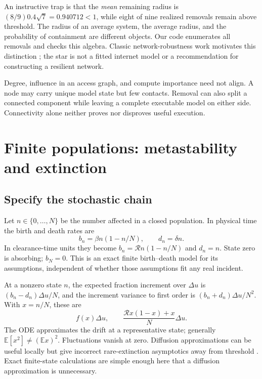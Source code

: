 \documentclass[11pt]{article}
\newcommand{\E}{\mathbb E}
\newcommand{\R}{\mathcal R}
\begin{document}
An instructive trap is that the \emph{mean} remaining radius is $(8/9)0.4\sqrt7=0.940712<1$, while eight of nine realized removals remain above threshold. The radius of an average system, the average radius, and the probability of containment are different objects. Our code enumerates all removals and checks this algebra. Classic network-robustness work motivates this distinction \citep{albert}; the star is not a fitted internet model or a recommendation for constructing a resilient network.

Degree, influence in an access graph, and compute importance need not align. A node may carry unique model state but few contacts. Removal can also split a connected component while leaving a complete executable model on either side. Connectivity alone neither proves nor disproves useful execution.

\section{Finite populations: metastability and extinction}
\subsection{Specify the stochastic chain}
Let $n\in\{0,\ldots,N\}$ be the number affected in a closed population. In physical time the birth and death rates are
\begin{equation}
b_n=\beta n(1-n/N),\qquad d_n=\delta n.
\end{equation}
In clearance-time units they become $b_n=\R n(1-n/N)$ and $d_n=n$. State zero is absorbing; $b_N=0$. This is an exact finite birth--death model for its assumptions, independent of whether those assumptions fit any real incident.

At a nonzero state $n$, the expected fraction increment over $\Delta u$ is $(b_n-d_n)\Delta u/N$, and the increment variance to first order is $(b_n+d_n)\Delta u/N^2$. With $x=n/N$, these are
\begin{equation}
f(x)\Delta u,\qquad\frac{\R x(1-x)+x}{N}\Delta u.
\end{equation}
The ODE approximates the drift at a representative state; generally $\E[x^2]\ne(\E x)^2$. Fluctuations vanish at zero. Diffusion approximations can be useful locally but give incorrect rare-extinction asymptotics away from threshold \citep{doering}. Exact finite-state calculations are simple enough here that a diffusion approximation is unnecessary.
\end{document}
